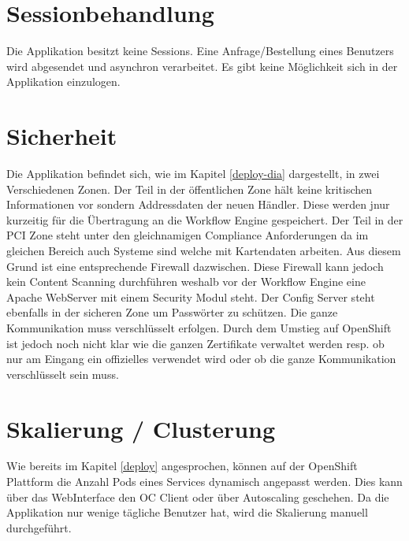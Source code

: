 \section{Sessionbehandlung}

Die Applikation besitzt keine Sessions. Eine Anfrage/Bestellung eines Benutzers wird abgesendet und asynchron verarbeitet. Es gibt keine Möglichkeit sich in der Applikation einzulogen.

\section{Sicherheit}

Die Applikation befindet sich, wie im Kapitel \ref{deploy-dia} dargestellt, in zwei Verschiedenen Zonen. Der Teil in der öffentlichen Zone hält keine kritischen Informationen vor sondern Addressdaten der neuen Händler. Diese werden jnur kurzeitig für die Übertragung an die Workflow Engine gespeichert. Der Teil in der PCI Zone steht unter den gleichnamigen Compliance Anforderungen da im gleichen Bereich auch Systeme sind welche mit Kartendaten arbeiten. Aus diesem Grund ist eine entsprechende Firewall dazwischen. Diese Firewall kann jedoch kein Content Scanning durchführen weshalb vor der Workflow Engine eine Apache WebServer mit einem Security Modul steht. Der Config Server steht ebenfalls in der sicheren Zone um Passwörter zu schützen. Die ganze Kommunikation muss verschlüsselt erfolgen. Durch dem Umstieg auf OpenShift ist jedoch noch nicht klar wie die ganzen Zertifikate verwaltet werden resp. ob nur am Eingang ein offizielles verwendet wird oder ob die ganze Kommunikation verschlüsselt sein muss.

\section{Skalierung / Clusterung}

Wie bereits im Kapitel \ref{deploy} angesprochen, können auf der OpenShift Plattform die Anzahl Pods eines Services dynamisch angepasst werden. Dies kann über das WebInterface den OC Client oder über Autoscaling geschehen. Da die Applikation nur wenige tägliche Benutzer hat, wird die Skalierung manuell durchgeführt.

